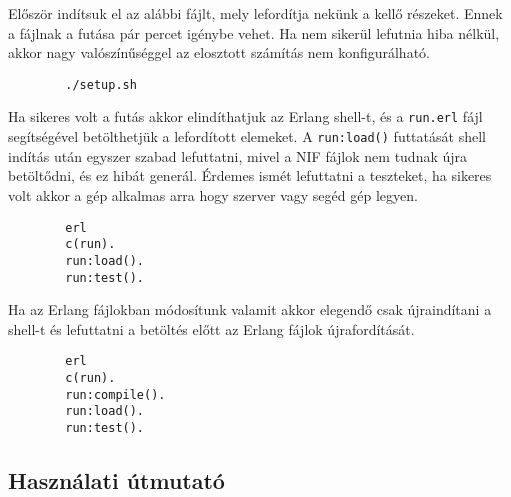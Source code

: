	Először indítsuk el az alábbi fájlt, mely lefordítja nekünk a kellő részeket. Ennek a fájlnak a futása pár percet igénybe vehet. Ha nem sikerül lefutnia hiba nélkül, akkor nagy valószínűséggel az elosztott számítás nem konfigurálható. 
	\begin{verbatim}
		./setup.sh
	\end{verbatim}
	Ha sikeres volt a futás akkor elindíthatjuk az Erlang shell-t, és a \texttt{run.erl} fájl segítségével betölthetjük a lefordított elemeket. A \texttt{run:load()} futtatását shell indítás után egyszer szabad lefuttatni, mivel a NIF fájlok nem tudnak újra betöltődni, és ez hibát generál.\newline
	Érdemes ismét lefuttatni a teszteket, ha sikeres volt akkor a gép alkalmas arra hogy szerver vagy segéd gép legyen.
	\begin{verbatim}
		erl
		c(run).
		run:load().
		run:test().
	\end{verbatim}
	Ha az Erlang fájlokban módosítunk valamit akkor elegendő csak újraindítani a shell-t és lefuttatni a betöltés előtt az Erlang fájlok újrafordítását.
	\begin{verbatim}
		erl
		c(run).
		run:compile().
		run:load().
		run:test().
	\end{verbatim}  
	

\subsection{Használati útmutató}
